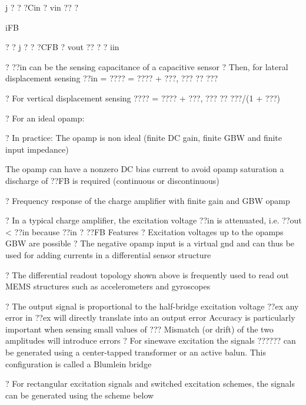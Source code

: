\documentclass[2pt,landscape]{article}
\begin{document}
\begin{multicols*}{5}
j ? ? ?Cin ? vin ?? ?


iFB


? ? j ? ? ?CFB ? 
vout ?? ? ? iin





?	??in can be the sensing capacitance of a capacitive sensor
?	Then, for lateral displacement sensing ??in = ???? = ???? + ???, ??? ?? ???

?	For vertical displacement sensing ???? = ???? + ???, ??? ?? ???/(1 + ???)




?	For an ideal opamp:

?	In practice:
\textbullet 	The opamp is non ideal (finite DC gain, finite GBW and finite input 
impedance)


\textbullet 	The opamp can have a nonzero DC bias current 
to avoid opamp saturation a
discharge of ??FB is required 
(continuous or discontinuous)



?	Frequency response of the charge 
amplifier with finite gain and GBW opamp







?	In a typical charge amplifier, 
the excitation voltage ??in is 
attenuated, i.e. ??out < ??in 
because ??in ? ??FB
Features
?	Excitation voltages up to the 
opamp\textbullet s GBW are possible
?	The negative opamp input is a 
virtual gnd and can thus be 
used for adding currents in a 
differential sensor structure






?	The differential readout topology shown above is frequently used to 
read out MEMS structures such as accelerometers and gyroscopes



?	The output signal is proportional to the half-bridge excitation voltage \textbullet ??ex
any error in \textbullet ??ex will directly translate into an output error 
Accuracy is particularly important when sensing small values of ??? 
Mismatch (or drift) of the two amplitudes will introduce errors
?	For sinewave excitation the signals \textbullet ?????? 
can be generated using a center-tapped 
transformer or an active balun. This 
configuration is called a Blumlein bridge


?	For rectangular excitation signals and 
switched excitation schemes, the signals 
can be generated using the scheme below




\end{multicols*}
\end{document}
